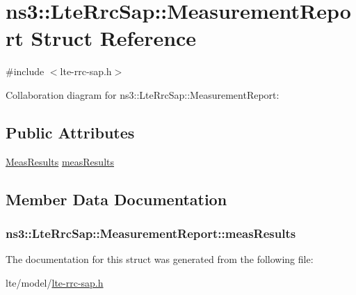 \hypertarget{structns3_1_1LteRrcSap_1_1MeasurementReport}{}\section{ns3\+:\+:Lte\+Rrc\+Sap\+:\+:Measurement\+Report Struct Reference}
\label{structns3_1_1LteRrcSap_1_1MeasurementReport}


{\ttfamily \#include $<$lte-\/rrc-\/sap.\+h$>$}



Collaboration diagram for ns3\+:\+:Lte\+Rrc\+Sap\+:\+:Measurement\+Report\+:
\subsection*{Public Attributes}
\begin{DoxyCompactItemize}
\item 
\hyperlink{structns3_1_1LteRrcSap_1_1MeasResults}{Meas\+Results} \hyperlink{structns3_1_1LteRrcSap_1_1MeasurementReport_a84a65ffec25d719fdcba03fb28ca5b86}{meas\+Results}
\end{DoxyCompactItemize}


\subsection{Member Data Documentation}
\subsubsection[{\texorpdfstring{meas\+Results}{measResults}}]{ ns3\+::\+Lte\+Rrc\+Sap\+::\+Measurement\+Report\+::meas\+Results}\hypertarget{structns3_1_1LteRrcSap_1_1MeasurementReport_a84a65ffec25d719fdcba03fb28ca5b86}{}\label{structns3_1_1LteRrcSap_1_1MeasurementReport_a84a65ffec25d719fdcba03fb28ca5b86}


The documentation for this struct was generated from the following file\+:\begin{DoxyCompactItemize}
\item 
lte/model/\hyperlink{lte-rrc-sap_8h}{lte-\/rrc-\/sap.\+h}\end{DoxyCompactItemize}
